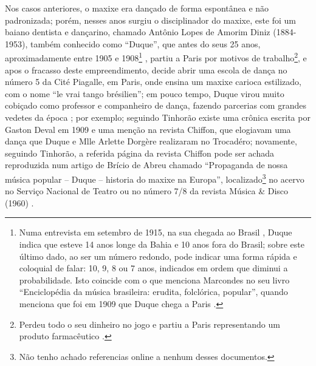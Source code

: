 
Nos casos anteriores, o maxixe era dançado de forma espontânea e não padronizada;
porém, nesses anos surgiu
o disciplinador do maxixe, este foi um baiano dentista e dançarino, 
chamado Antônio Lopes de Amorim Diniz (1884-1953), também conhecido como ``Duque'', 
que antes do seus 25 anos, 
aproximadamente entre 1905 e 1908\footnote{Numa 
entrevista em setembro de 1915, na sua chegada ao Brasil \cite[pp. 1]{maxixeparis1915:0}, 
Duque indica que esteve 14 anos longe da Bahia e 10 anos fora do Brasil;
sobre este último dado, ao ser um número redondo, 
pode indicar uma forma rápida e coloquial de falar: 
 10, 9, 8 ou 7 anos, indicados em ordem que diminui a probabilidade.
Isto coincide com o que menciona Marcondes no seu livro 
``Enciclopédia da música brasileira: erudita, folclórica, popular'',
quando menciona que foi em 1909 que Duque chega a Paris \cite[pp. 242]{marcondes1977enciclopedia}.} 
\cite[pp. 1]{maxixeparis1915:0} \cite[pp. 130]{efege1974maxixe} \cite[pp. 82-83]{tinhorao1986pequena} \cite[pp. 242]{marcondes1977enciclopedia},
partiu a Paris por motivos de trabalho\footnote{Perdeu 
todo o seu dinheiro no jogo e partiu a Paris representando 
um produto farmacêutico \cite[pp. 82]{tinhorao1986pequena}.}, e apos o fracasso deste empreendimento,
decide abrir uma escola de dança no número 5 da Cité Piagalle, em Paris, onde ensina um maxixe carioca estilizado,
com o nome ``le vrai tango brésilien''; em pouco tempo, 
Duque virou muito cobiçado como professor e companheiro de dança,
fazendo parcerias com grandes vedetes da época \cite[pp. 82]{tinhorao1986pequena} \cite[pp. 131]{efege1974maxixe}; 
por exemplo; seguindo Tinhorão \cite[pp. 82]{tinhorao1986pequena} 
existe uma crônica escrita por Gaston Deval em 1909 e uma menção na revista Chiffon,
que elogiavam uma dança que Duque e Mlle Arlette Dorgère realizaram no Trocadéro;
novamente, seguindo Tinhorão, a referida página da revista Chiffon pode ser achada
reproduzida num artigo de Brício de Abreu chamado 
``Propaganda de nossa música popular -- Duque -- historia do maxixe na Europa'',
localizado\footnote{Não tenho achado referencias online a nenhum desses documentos.} 
no acervo no Serviço Nacional de Teatro ou 
no número 7/8 da revista  Música \& Disco (1960) \cite[pp. 94]{tinhorao1986pequena}.

